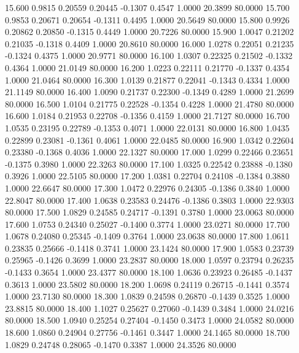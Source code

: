   15.600   0.9815   0.20559   0.20445  -0.1307   0.4547   1.0000  20.3899  80.0000
  15.700   0.9853   0.20671   0.20654  -0.1311   0.4495   1.0000  20.5649  80.0000
  15.800   0.9926   0.20862   0.20850  -0.1315   0.4449   1.0000  20.7226  80.0000
  15.900   1.0047   0.21202   0.21035  -0.1318   0.4409   1.0000  20.8610  80.0000
  16.000   1.0278   0.22051   0.21235  -0.1324   0.4375   1.0000  20.9771  80.0000
  16.100   1.0307   0.22325   0.21502  -0.1332   0.4364   1.0000  21.0149  80.0000
  16.200   1.0223   0.22111   0.21770  -0.1337   0.4354   1.0000  21.0464  80.0000
  16.300   1.0139   0.21877   0.22041  -0.1343   0.4334   1.0000  21.1149  80.0000
  16.400   1.0090   0.21737   0.22300  -0.1349   0.4289   1.0000  21.2699  80.0000
  16.500   1.0104   0.21775   0.22528  -0.1354   0.4228   1.0000  21.4780  80.0000
  16.600   1.0184   0.21953   0.22708  -0.1356   0.4159   1.0000  21.7127  80.0000
  16.700   1.0535   0.23195   0.22789  -0.1353   0.4071   1.0000  22.0131  80.0000
  16.800   1.0435   0.22899   0.23081  -0.1361   0.4061   1.0000  22.0485  80.0000
  16.900   1.0342   0.22604   0.23380  -0.1368   0.4036   1.0000  22.1327  80.0000
  17.000   1.0299   0.22466   0.23651  -0.1375   0.3980   1.0000  22.3263  80.0000
  17.100   1.0325   0.22542   0.23888  -0.1380   0.3926   1.0000  22.5105  80.0000
  17.200   1.0381   0.22704   0.24108  -0.1384   0.3880   1.0000  22.6647  80.0000
  17.300   1.0472   0.22976   0.24305  -0.1386   0.3840   1.0000  22.8047  80.0000
  17.400   1.0638   0.23583   0.24476  -0.1386   0.3803   1.0000  22.9303  80.0000
  17.500   1.0829   0.24585   0.24717  -0.1391   0.3780   1.0000  23.0063  80.0000
  17.600   1.0753   0.24340   0.25027  -0.1400   0.3774   1.0000  23.0271  80.0000
  17.700   1.0678   0.24080   0.25345  -0.1409   0.3764   1.0000  23.0638  80.0000
  17.800   1.0611   0.23835   0.25666  -0.1418   0.3741   1.0000  23.1424  80.0000
  17.900   1.0583   0.23739   0.25965  -0.1426   0.3699   1.0000  23.2837  80.0000
  18.000   1.0597   0.23794   0.26235  -0.1433   0.3654   1.0000  23.4377  80.0000
  18.100   1.0636   0.23923   0.26485  -0.1437   0.3613   1.0000  23.5802  80.0000
  18.200   1.0698   0.24119   0.26715  -0.1441   0.3574   1.0000  23.7130  80.0000
  18.300   1.0839   0.24598   0.26870  -0.1439   0.3525   1.0000  23.8815  80.0000
  18.400   1.1027   0.25627   0.27060  -0.1439   0.3484   1.0000  24.0216  80.0000
  18.500   1.0940   0.25254   0.27404  -0.1450   0.3473   1.0000  24.0582  80.0000
  18.600   1.0860   0.24904   0.27756  -0.1461   0.3447   1.0000  24.1465  80.0000
  18.700   1.0829   0.24748   0.28065  -0.1470   0.3387   1.0000  24.3526  80.0000
